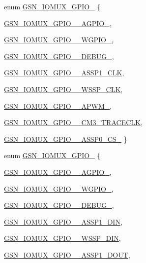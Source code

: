 \begin{DoxyCompactItemize}
enum \hyperlink{a00519_ae788d1528887c2751ee9d5c4892ef281}{GSN\_\-IOMUX\_\-GPIO\_} \{ \par
\hyperlink{a00519_ae788d1528887c2751ee9d5c4892ef281a49087f3c9a6c5142bbbcd18160190834}{GSN\_\-IOMUX\_\-GPIO\_\_\-AGPIO\_}, 
\par
\hyperlink{a00519_ae788d1528887c2751ee9d5c4892ef281a551b2df537db340b242806d941da1f21}{GSN\_\-IOMUX\_\-GPIO\_\_\-WGPIO\_}, 
\par
\hyperlink{a00519_ae788d1528887c2751ee9d5c4892ef281a7fef3665d8dd11c6b0d3e3daf953f4c6}{GSN\_\-IOMUX\_\-GPIO\_\_\-DEBUG\_}, 
\par
\hyperlink{a00519_ae788d1528887c2751ee9d5c4892ef281ab3df716e914ca3daea41cb3ad13cdacd}{GSN\_\-IOMUX\_\-GPIO\_\_\-ASSP1\_\-CLK}, 
\par
\hyperlink{a00519_ae788d1528887c2751ee9d5c4892ef281aa3d68b3b80f465b2025df37ac171fe51}{GSN\_\-IOMUX\_\-GPIO\_\_\-WSSP\_\-CLK}, 
\par
\hyperlink{a00519_ae788d1528887c2751ee9d5c4892ef281a5085454264684f8e777d39c4c886a08d}{GSN\_\-IOMUX\_\-GPIO\_\_\-APWM\_}, 
\par
\hyperlink{a00519_ae788d1528887c2751ee9d5c4892ef281a658695500d92d5d4d4829e5458290877}{GSN\_\-IOMUX\_\-GPIO\_\_\-CM3\_\-TRACECLK}, 
\par
\hyperlink{a00519_ae788d1528887c2751ee9d5c4892ef281a06c13a0f8cb5148de5e0a3afb5faab49}{GSN\_\-IOMUX\_\-GPIO\_\_\-ASSP0\_\-CS\_}
 \}
\item 
enum \hyperlink{a00519_a44939fa9f5f560069cce43fb9e7583f1}{GSN\_\-IOMUX\_\-GPIO\_} \{ \par
\hyperlink{a00519_a44939fa9f5f560069cce43fb9e7583f1a47e269b6814da7b1a8c1bba4e2ff1afd}{GSN\_\-IOMUX\_\-GPIO\_\_\-AGPIO\_}, 
\par
\hyperlink{a00519_a44939fa9f5f560069cce43fb9e7583f1a03cbcf5fe760ee3f7b76e5e08ca59549}{GSN\_\-IOMUX\_\-GPIO\_\_\-WGPIO\_}, 
\par
\hyperlink{a00519_a44939fa9f5f560069cce43fb9e7583f1a05be6d0c74d04c972b24b37d10814643}{GSN\_\-IOMUX\_\-GPIO\_\_\-DEBUG\_}, 
\par
\hyperlink{a00519_a44939fa9f5f560069cce43fb9e7583f1ab089b51752bc2a701bf8fc0f5cc5287e}{GSN\_\-IOMUX\_\-GPIO\_\_\-ASSP1\_\-DIN}, 
\par
\hyperlink{a00519_a44939fa9f5f560069cce43fb9e7583f1ab2a384680c8861552ac1df393c1658f0}{GSN\_\-IOMUX\_\-GPIO\_\_\-WSSP\_\-DIN}, 
\par
\hyperlink{a00519_a44939fa9f5f560069cce43fb9e7583f1a741d3a8109675c4d167524193b185df8}{GSN\_\-IOMUX\_\-GPIO\_\_\-ASSP1\_\-DOUT}, 

\end{DoxyCompactItemize}
